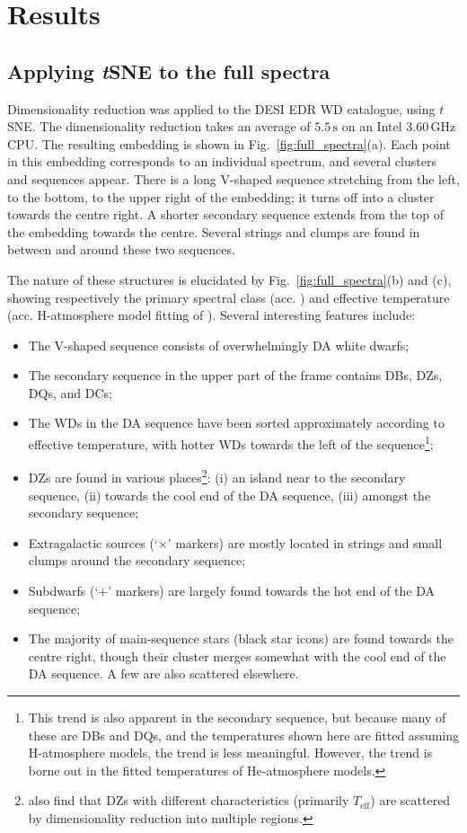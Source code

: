 \documentclass[fleqn,usenatbib]{mnras}
\def\Teff{T_\mathrm{eff}}
\begin{document}
\section{Results}
\label{sec:results}

\subsection{Applying \textit{t}SNE to the full spectra}
\label{sec:full_spectra}

Dimensionality reduction was applied to the DESI EDR WD catalogue, using $t$SNE.
The dimensionality reduction takes an average of $5.5\,\text{s}$ on an Intel $3.60\,\text{GHz}$ CPU.
The resulting embedding is shown in Fig.~\ref{fig:full_spectra}(a).
Each point in this embedding corresponds to an individual spectrum, and
several clusters and sequences appear.
There is a long V-shaped sequence stretching from the left, to the bottom, to the upper right of the embedding; it turns off into a cluster towards the centre right.
A shorter secondary sequence extends from the top of the embedding towards the centre.
Several strings and clumps are found in between and around these two sequences.

The nature of these structures is elucidated by Fig.~\ref{fig:full_spectra}(b) and (c), showing respectively the primary spectral class (acc. \citealt{manser24}) and effective temperature (acc. H-atmosphere model fitting of \citealt{gentilefusillo19}).
Several interesting features include:
\begin{itemize}
\item
The V-shaped sequence consists of overwhelmingly DA white dwarfs;
\item
The secondary sequence in the upper part of the frame contains DBs, DZs, DQs, and DCs;
\item
The WDs in the DA sequence have been sorted approximately according to effective temperature, with hotter WDs towards the left of the sequence\footnote{
    This trend is also apparent in the secondary sequence, but because many of these are DBs and DQs, and the temperatures shown here are fitted assuming H-atmosphere models, the trend is less meaningful.
    However, the trend is borne out in the fitted temperatures of He-atmosphere models.
};
\item
DZs are found in various places\footnote{
    \citet{kao24} also find that DZs with different characteristics (primarily $\Teff$) are scattered by dimensionality reduction into multiple regions.
}: (i) an island near to the secondary sequence, (ii) towards the cool end of the DA sequence, (iii) amongst the secondary sequence;
\item
Extragalactic sources (`$\times$' markers) are mostly located in strings and small clumps around the secondary sequence;
\item 
Subdwarfs (`$+$' markers) are largely found towards the hot end of the DA sequence;
\item
The majority of main-sequence stars (black star icons) are found towards the centre right, though their cluster merges somewhat with the cool end of the DA sequence.
A few are also scattered elsewhere.
\end{itemize}
\end{document}
